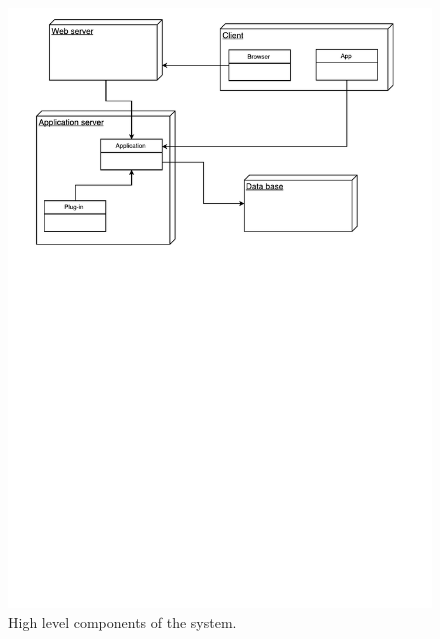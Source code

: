 \begin{figure}[h]
\centering
\includegraphics[width=\textwidth]{diagrams/high_level_components.pdf}
\caption{High level components of the system.}
\label{fig:high_level_components}
\end{figure}